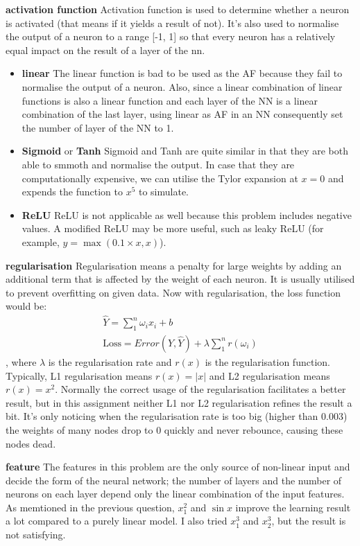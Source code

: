 \documentclass[12pt]{article}
\begin{document}
\noindent \textbf{activation function} Activation function is used to determine whether a neuron is activated (that means if it yields a result of not). It's also used to normalise the output of a neuron to a range [-1, 1] so that every neuron has a relatively equal impact on the result of a layer of the nn. 
\begin{itemize}
\item \textbf{linear} The linear function is bad to be used as the AF because they fail to normalise the output of a neuron. Also, since a linear combination of linear functions is also a linear function and each layer of the NN is a linear combination of the last layer, using linear as AF in an NN consequently set the number of layer of the NN to 1.
\item \textbf{Sigmoid} or \textbf{Tanh} Sigmoid and Tanh are quite similar in that they are both able to smmoth and normalise the output. In case that they are computationally expensive, we can utilise the Tylor expansion at $x=0$ and expends the function to $x^5$ to simulate.
\item \textbf{ReLU} ReLU is not applicable as well because this problem includes negative values. A modified ReLU may be more useful, such as leaky ReLU (for example, $y=\max(0.1\times x, x)$).
\end{itemize}

\noindent \textbf{regularisation} Regularisation means a penalty for large weights by adding an additional term that is affected by the weight of each neuron. It is usually utilised to prevent overfitting on given data. Now with regularisation, the loss function would be:
\begin{gather*}
\widehat{Y}=\sum_1^n\omega_i x_i+b\\
\textrm{Loss}=Error(Y, \widehat{Y})+\lambda\sum_1^n r(\omega_i)
\end{gather*}
, where $\lambda$ is the regularisation rate and $r(x)$ is the regularisation function. Typically, L1 regularisation means $r(x)=|x|$ and L2 regularisation means $r(x)=x^2$.
Normally the correct usage of the regularisation facilitates a better result, but in this assignment neither L1 nor L2 regularisation refines the result a bit. It's only noticing when the regularisation rate is too big (higher than 0.003) the weights of many nodes drop to 0 quickly and never rebounce, causing these nodes dead.

\noindent \textbf{feature} The features in this problem are the only source of non-linear input and decide the form of the neural network; the number of layers and the number of neurons on each layer depend only the linear combination of the input features. As memtioned in the previous question, $x_1^2$ and $\sin x$ improve the learning result a lot compared to a purely linear model. I also tried $x_1^3$ and $x_2^3$, but the result is not satisfying.
\end{document}
